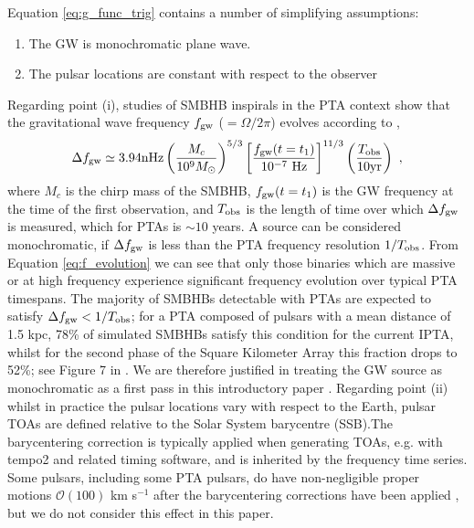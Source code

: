 \documentclass[fleqn,usenatbib,useAMS]{mnras}
\begin{document}
Equation \eqref{eq:g_func_trig} contains a number of simplifying assumptions:
\begin{enumerate}
	\item The GW is monochromatic plane wave.
	\item The pulsar locations are constant with respect to the observer 
\end{enumerate}
Regarding point (i), studies of SMBHB inspirals in the PTA context show that the gravitational wave frequency $f_{\rm gw}$ ($=\Omega / 2 \pi $) evolves according to \citep[e.g.][]{Zhu10},
\begin{equation}
	\Delta f_{\rm gw} \simeq 3.94 \mathrm{nHz}\left(\frac{M_c}{10^9 M_{\odot}}\right)^{5 / 3}\left[\frac{f_{\rm gw}(t=t_1)}{10^{-7} \mathrm{~Hz}}\right]^{11 / 3}\left(\frac{T_{\mathrm{obs}}}{10 \mathrm{yr}}\right) \ ,
	\label{eq:f_evolution}
\end{equation}
where $M_c$ is the chirp mass of the SMBHB, $f_{\rm gw}(t=t_1)$ is the GW frequency at the time of the first observation, and $T_{\rm obs}$ is the length of time over which $\Delta f_{\rm gw}$ is measured, which for PTAs is $\sim 10$ years. A source can be considered monochromatic, if $\Delta f_{\rm gw}$ is less than the PTA frequency resolution $1/T_{\rm obs}$. From Equation \eqref{eq:f_evolution} we can see that only those binaries which are massive or at high frequency experience significant frequency evolution over typical PTA timespans. The majority of SMBHBs detectable with PTAs are expected to satisfy $\Delta f_{\rm gw} < 1/T_{\rm obs}$; for a PTA composed of pulsars with a mean distance of 1.5 kpc, 78\% of simulated SMBHBs satisfy this condition for the current IPTA, whilst for the second phase of the Square Kilometer Array this fraction drops to 52\%; see Figure 7 in  \cite{Rosado10.1093/mnras/stv1098}. We are therefore justified in treating the GW source as monochromatic as a first pass in this introductory paper \citep{Sesana10,Sesana2010,Ellis2012ApJ}. Regarding point (ii) whilst in practice the pulsar locations vary with respect to the Earth, pulsar TOAs are defined relative to the Solar System barycentre (SSB).The barycentering correction is typically applied when generating TOAs, e.g. with {\sc tempo2} \citep{tempo2} and related timing software, and is inherited by the frequency time series. Some pulsars, including some PTA pulsars, do have non-negligible proper motions $\mathcal{O} (100)$ km s$^{-1}$ after the barycentering corrections have been applied \citep[e.g.][]{10.1093/mnras/sty3390}, but we do not consider this effect in this paper. 
\end{document}
